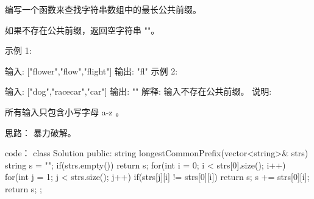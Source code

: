 编写一个函数来查找字符串数组中的最长公共前缀。

如果不存在公共前缀，返回空字符串 ""。

示例 1:

输入: ["flower","flow","flight"]
输出: "fl"
示例 2:

输入: ["dog","racecar","car"]
输出: ""
解释: 输入不存在公共前缀。
说明:

所有输入只包含小写字母 a-z 。













思路：
暴力破解。















code：
class Solution {
public:
    string longestCommonPrefix(vector<string>& strs) {
        string s = "";
        if(strs.empty()) return s;
        for(int i = 0; i < strs[0].size(); i++)
        {
            for(int j = 1; j < strs.size(); j++)
            {
                if(strs[j][i] != strs[0][i])
                    return s;
            }
            s += strs[0][i];
        }
        return s;
    }
};